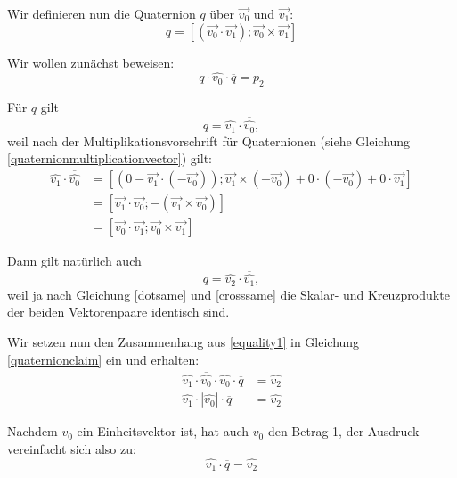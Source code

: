 Wir definieren nun die Quaternion $q$ über $\vec{v_0}$ und $\vec{v_1}$:
\begin{equation}
 q = \left[ ( \vec{v_0} \cdot \vec{v_1} ); \vec{v_0} \times \vec{v_1} \right]
\end{equation} 

Wir wollen zunächst beweisen:
\begin{equation}
 \label{quaternionclaim}
 q \cdot \hat{v_0} \cdot \overline{q} = p_2
\end{equation} 

Für $q$ gilt
\begin{equation}
 \label{equality1}
 q = \hat{v_1} \cdot \overline{\hat{v_0}},
\end{equation}
weil nach der Multiplikationsvorschrift für Quaternionen (siehe Gleichung \ref{quaternionmultiplicationvector}) gilt:
\begin{equation}
\begin{split}
 \hat{v_1} \cdot \overline{\hat{v_0}} &= \left[ \left( 0 - \vec{v_1} \cdot (-\vec{v_0}) \right); \vec{v_1} \times (-\vec{v_0}) + 0 \cdot (-\vec{v_0}) + 0 \cdot \vec{v_1} \right] \\
 &= \left[ \vec{v_1} \cdot \vec{v_0}; -( \vec{v_1} \times \vec{v_0}) \right] \\
 &= \left[ \vec{v_0} \cdot \vec{v_1}; \vec{v_0} \times \vec{v_1} \right]
\end{split}
\end{equation} 

Dann gilt natürlich auch
\begin{equation}
 \label{equality2}
 q = \hat{v_2} \cdot \overline{\hat{v_1}},
\end{equation} 
weil ja nach Gleichung \ref{dotsame} und \ref{crosssame} die Skalar- und Kreuzprodukte der beiden Vektorenpaare identisch sind.

Wir setzen nun den Zusammenhang aus \ref{equality1} in Gleichung \ref{quaternionclaim} ein und erhalten:
\begin{equation}
\begin{split}
 \label{step1}
 \hat{v_1} \cdot \overline{\hat{v_0}} \cdot \hat{v_0} \cdot \overline{q} &= \hat{v_2} \\
 \hat{v_1} \cdot \left| \hat{v_0} \right| \cdot \overline{q} &= \hat{v_2}
\end{split}
\end{equation}

Nachdem $v_0$ ein Einheitsvektor ist, hat auch $\hat{v_0}$ den Betrag 1, der Ausdruck vereinfacht sich also zu:
\begin{equation}
 \hat{v_1} \cdot \overline{q} = \hat{v_2}
\end{equation}

